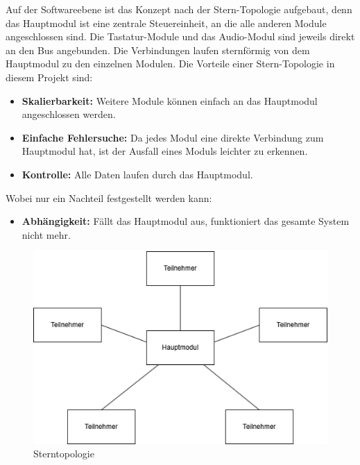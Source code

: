 Auf der Softwareebene ist das Konzept nach der Stern-Topologie aufgebaut, denn das Hauptmodul ist eine zentrale Steuereinheit, an die alle anderen Module angeschlossen sind. Die Tastatur-Module und das Audio-Modul sind jeweils direkt an den Bus angebunden. Die Verbindungen laufen sternförmig von dem Hauptmodul zu den einzelnen Modulen. Die Vorteile einer Stern-Topologie in diesem Projekt sind:
\begin{itemize}
    \item \textbf{Skalierbarkeit:} Weitere Module können einfach an das Hauptmodul angeschlossen werden.
    \item \textbf{Einfache Fehlersuche:} Da jedes Modul eine direkte Verbindung zum Hauptmodul hat, ist der Ausfall eines Moduls leichter zu erkennen.
    \item \textbf{Kontrolle:} Alle Daten laufen durch das Hauptmodul.
\end{itemize}
Wobei nur ein Nachteil festgestellt werden kann:
\begin{itemize}
    \item \textbf{Abhängigkeit:} Fällt das Hauptmodul aus, funktioniert das gesamte System nicht mehr.
\end{itemize}
\begin{figure}[H]
	\centering    
	\includegraphics[width=.8\textwidth]{Bilder/sterntopologie.png}
	\caption{Sterntopologie}
	\label{Sterntopologie}
\end{figure}
